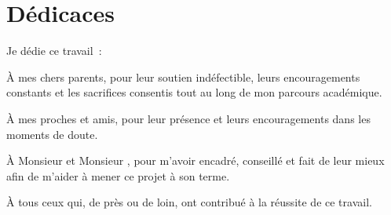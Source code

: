 \chapter*{\Huge Dédicaces}

\begingroup
    \large \raggedright Je dédie ce travail~:

    \vspace{4mm}

    À mes chers parents, pour leur soutien indéfectible, leurs encouragements constants et les sacrifices consentis tout au long de mon parcours académique.

    \vspace{4mm}

    À mes proches et amis, pour leur présence et leurs encouragements dans les moments de doute.

    \vspace{4mm}

    À Monsieur \textbf{\@proFramerName} et Monsieur \textbf{\@academicFramerName}, pour m'avoir encadré, conseillé et fait de leur mieux afin de m'aider à mener ce projet à son terme.

    \vspace{4mm}

    À tous ceux qui, de près ou de loin, ont contribué à la réussite de ce travail.
\endgroup

\vspace{8mm}
\begin{flushright}
    \LARGE \@author
\end{flushright}
